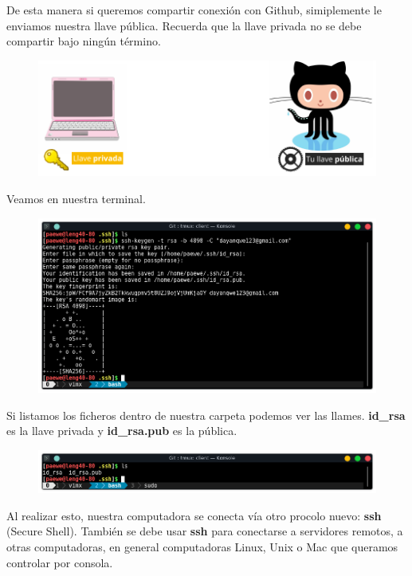 \documentclass{article}
\begin{document}
\newpage

De esta manera si queremos compartir conexión con Github, simiplemente le
enviamos nuestra llave pública. Recuerda que la llave privada no se debe
compartir bajo ningún término.

\begin{figure}[h!]
  \centering
  \includegraphics[scale=0.5]{./Pictures/214_public_key.png}
\end{figure}

Veamos en nuestra terminal.

\begin{figure}[h!]
  \centering
  \includegraphics[scale=0.75]{./Pictures/219_ssh-keygen.png}
\end{figure}

Si listamos los ficheros dentro de nuestra carpeta podemos ver las llames.
\textbf{id\_rsa} es la llave privada y \textbf{id\_rsa.pub} es la pública.

\begin{figure}[h!]
  \centering
  \includegraphics[scale=0.75]{./Pictures/220_id_rsa.png}
\end{figure}

Al realizar esto, nuestra computadora se conecta vía otro procolo nuevo:
\textbf{ssh} (Secure Shell). También se debe usar \textbf{ssh} para conectarse
a servidores remotos, a otras computadoras, en general computadoras Linux, Unix
o Mac que queramos controlar por consola.\\
\end{document}

